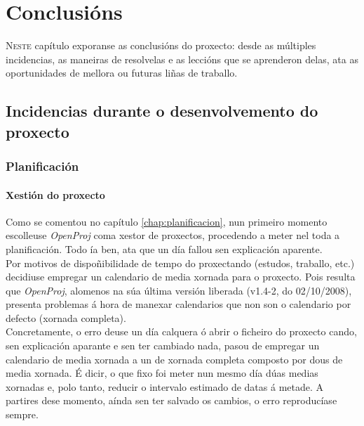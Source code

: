 \chapter{Conclusións}
\minitoc
\label{chap:conclusiones}
\vspace{0.5cm}


\lettrine{N}{este} capítulo exporanse as conclusións do proxecto: desde as
múltiples incidencias, as maneiras de resolvelas e as leccións que se
aprenderon delas, ata as oportunidades de mellora ou futuras liñas de traballo.

\section{Incidencias durante o desenvolvemento do proxecto}

 \subsection{Planificación}

  \subsubsection{Xestión do proxecto}

  Como se comentou no capítulo \ref{chap:planificacion}, nun primeiro momento
  escolleuse \textit{OpenProj} coma xestor de proxectos, procedendo a meter
  nel toda a planificación. Todo ía ben, ata que un día fallou sen explicación
  aparente. \\

  Por motivos de dispoñibilidade de tempo do proxectando (estudos, traballo,
  etc.) decidiuse empregar un calendario de media xornada para o proxecto. Pois
  resulta que \textit{OpenProj}, alomenos na súa última versión liberada
  (v1.4-2, do 02/10/2008), presenta problemas á hora de manexar calendarios que
  non son o calendario por defecto (xornada completa). \\

  Concretamente, o erro deuse un día calquera ó abrir o ficheiro do proxecto
  cando, sen explicación aparante e sen ter cambiado nada, pasou de empregar un
  calendario de media xornada a un de xornada completa composto por dous de
  media xornada. É dicir, o que fixo foi meter nun mesmo día dúas medias
  xornadas e, polo tanto, reducir o intervalo estimado de datas á metade. A
  partires dese momento, aínda sen ter salvado os cambios, o erro reproducíase
  sempre. \\

